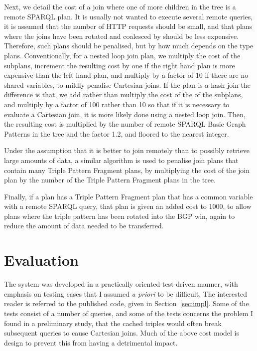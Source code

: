\documentclass[a4paper, 12pt]{article}
\begin{document}
Next, we detail the cost of a join where one of more children in the
tree is a remote SPARQL plan. It is usually not wanted to execute
several remote queries, it is assumed that the number of HTTP requests
should be small, and that plans where the joins have been rotated and
coalesced by  should be
less expensive. Therefore, such plans should be penalised, but by how
much depends on the type plans. Conventionally, for a nested loop join
plan, we multiply the cost of the subplans, increment the resulting
cost by one if the right hand plan is more expensive than the left
hand plan, and multiply by a factor of 10 if there are no shared
variables, to mildly penalise Cartesian joins. If the plan is a hash
join the difference is that, we add rather than multiply the cost of
the of the subplans, and multiply by a factor of 100 rather than 10 so
that if it is necessary to evaluate a Cartesian join, it is more
likely done using a nested loop join. Then, the resulting cost is
multiplied by the number of remote SPARQL Basic Graph Patterns in the
tree and the factor 1.2, and floored to the nearest integer.

Under the assumption that it is better to join remotely than to
possibly retrieve large amounts of data, a similar algorithm is used
to penalise join plans that contain many Triple Pattern Fragment
plans, by multiplying the cost of the join plan by the number of the
Triple Pattern Fragment plans in the tree.

Finally, if a plan has a Triple Pattern Fragment plan that has a
common variable with a remote SPARQL query, that plan is given an
added cost to 1000, to allow plans where the triple pattern has been
rotated into the BGP win, again to reduce the amount of data needed to
be transferred.

\section{Evaluation}

The system was developed in a practically oriented test-driven manner,
with emphasis on testing cases that I assumed \textit{a priori} to be
difficult. The interested reader is referred to the published code,
given in Section~\ref{sec:impl}. Some of the tests consist of a number
of queries, and some of the tests concerns the problem I found in a
preliminary study, that the cached triples would often break
subsequent queries to cause Cartesian joins. Much of the above cost
model is design to prevent this from having a detrimental impact.
\end{document}

